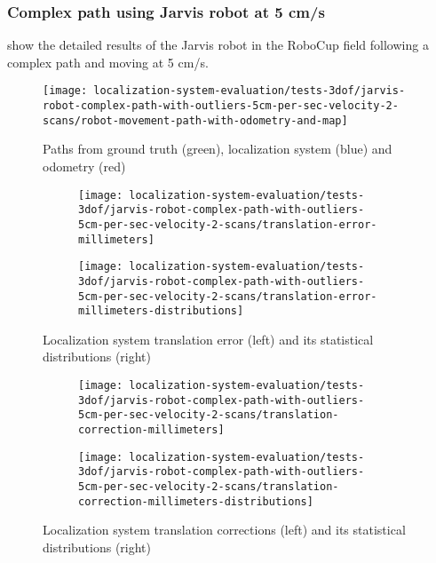 \subsubsection{Complex path using Jarvis robot at 5 cm/s}

 show the detailed results of the Jarvis robot in the RoboCup field following a complex path and moving at 5 cm/s.

\begin{figure}[H]
	\centering
	\texttt{[image: localization-system-evaluation/tests-3dof/jarvis-robot-complex-path-with-outliers-5cm-per-sec-velocity-2-scans/robot-movement-path-with-odometry-and-map]}
	\caption{Paths from ground truth (green), localization system (blue) and odometry (red)}
	\label{fig:localization-system-evaluation_jarvis-robot-complex-path-with-outliers-5cm-per-sec-velocity-2-scans}
\end{figure}

\begin{figure}[H]
	\centering
	\begin{subfigure}[h]{.497\textwidth}
		\centering
		\texttt{[image: localization-system-evaluation/tests-3dof/jarvis-robot-complex-path-with-outliers-5cm-per-sec-velocity-2-scans/translation-error-millimeters]}
	\end{subfigure}
	\begin{subfigure}[h]{.497\textwidth}
		\centering
		\texttt{[image: localization-system-evaluation/tests-3dof/jarvis-robot-complex-path-with-outliers-5cm-per-sec-velocity-2-scans/translation-error-millimeters-distributions]}
	\end{subfigure}
	\caption{Localization system translation error (left) and its statistical distributions (right)}
	\label{fig:localization-system-evaluation_jarvis-robot-complex-path-with-outliers-5cm-per-sec-velocity-2-scans_translation-errors}
\end{figure}

\begin{figure}[H]
	\centering
	\begin{subfigure}[h]{.497\textwidth}
		\centering
		\texttt{[image: localization-system-evaluation/tests-3dof/jarvis-robot-complex-path-with-outliers-5cm-per-sec-velocity-2-scans/translation-correction-millimeters]}
	\end{subfigure}
	\begin{subfigure}[h]{.497\textwidth}
		\centering
		\texttt{[image: localization-system-evaluation/tests-3dof/jarvis-robot-complex-path-with-outliers-5cm-per-sec-velocity-2-scans/translation-correction-millimeters-distributions]}
	\end{subfigure}
	\caption{Localization system translation corrections (left) and its statistical distributions (right)}
	\label{fig:localization-system-evaluation_jarvis-robot-complex-path-with-outliers-5cm-per-sec-velocity-2-scans_translation-errors-corrections}
\end{figure}

